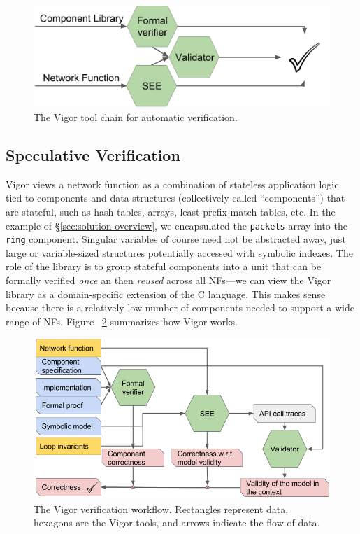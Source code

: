 \documentclass[letterpaper,twocolumn,10pt]{article}
\newcommand{\code}[1]{\lstinline{#1}}
\begin{document}
\begin{figure}[h!]
    \includegraphics[width=\columnwidth]{figures/impl_overview.png}
    \caption{The Vigor tool chain for automatic verification.}
    \label{fig:arch}
\end{figure}

\subsection{Speculative Verification}
\label{sec:our-approach}

Vigor views a network function as a combination of stateless application logic
tied to components and data structures (collectively called ``components'') that
are stateful, such as hash tables, arrays, least-prefix-match tables, etc. In
the example of \S\ref{sec:solution-overview}, we encapsulated the \code{packets}
array into the \code{ring} component. Singular variables of course need not be
abstracted away, just large or variable-sized structures potentially accessed
with symbolic indexes. The role of the library is to group stateful components
into a unit that can be formally verified {\em once} an then {\em reused} across
all NFs---we can view the Vigor library as a domain-specific extension of the C
language. This makes sense because there is a relatively low number of
components needed to support a wide range of NFs. Figure~ \ref{fig:algo}
summarizes how Vigor works.

\begin{figure}[]
    \includegraphics[width=\columnwidth]{figures/vigor_algorithm.png}
    \caption{The Vigor verification workflow. Rectangles represent data, hexagons are the Vigor tools, and arrows indicate the flow of data.}
    \label{fig:algo}
\end{figure}
\end{document}
